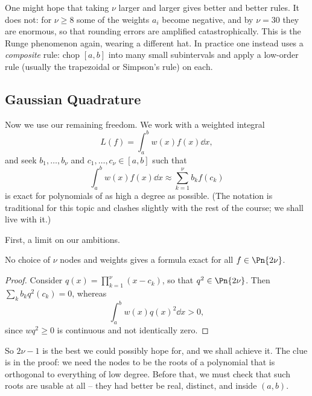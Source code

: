 \begin{remark}
  One might hope that taking $\nu$ larger and larger gives better and better rules. It does not: for $\nu \geq 8$ some of the weights $a_i$ become negative, and by $\nu = 30$ they are enormous, so that rounding errors are amplified catastrophically. This is the Runge phenomenon again, wearing a different hat. In practice one instead uses a \emph{composite} rule: chop $[a,b]$ into many small subintervals and apply a low-order rule (usually the trapezoidal or Simpson's rule) on each.
\end{remark}

\subsection{Gaussian Quadrature}

Now we use our remaining freedom. We work with a weighted integral
$$
L(f) = \int_a^b w(x)f(x)\dd x,
$$
and seek  $b_1, \dots, b_\nu$ and  $c_1, \dots, c_\nu \in [a,b]$ such that
$$
\int_a^b w(x)f(x)\dd x \approx \sum_{k=1}^{\nu}b_k f(c_k)
$$
is exact for polynomials of as high a degree as possible. (The notation is traditional for this topic and clashes slightly with the rest of the course; we shall live with it.)

First, a limit on our ambitions.

\begin{proposition}\label{prop:gaussmax}
  No choice of $\nu$ nodes and weights gives a formula exact for all $f \in \Pn{2\nu}$.
\end{proposition}
\begin{proof}
  Consider $q(x) = \prod_{k=1}^\nu (x - c_k)$, so that $q^2 \in \Pn{2\nu}$. Then $\sum_k b_k q^2(c_k) = 0$, whereas
  $$
  \int_a^b w(x)q(x)^2\dd x > 0,
  $$
  since $wq^2 \geq 0$ is continuous and not identically zero.
\end{proof}

So $2\nu - 1$ is the best we could possibly hope for, and we shall achieve it. The clue is in the proof: we need the nodes to be the roots of a polynomial that is orthogonal to everything of low degree. Before that, we must check that such roots are usable at all -- they had better be real, distinct, and inside $(a,b)$.

